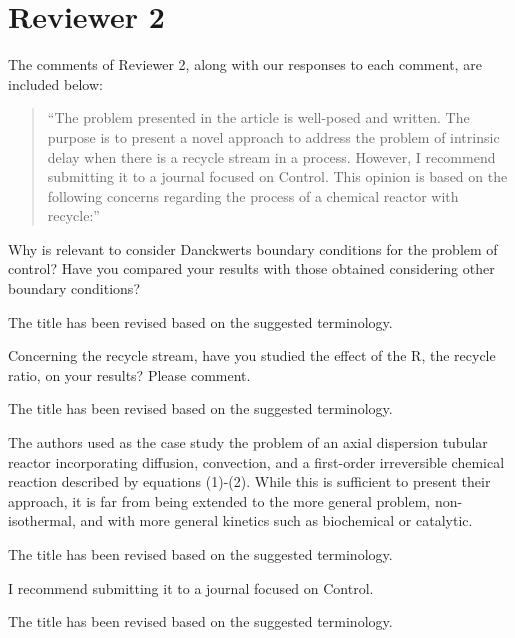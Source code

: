 \documentclass[10pt,answers]{exam}
\begin{document}
\newpage

\section*{Reviewer 2}

The comments of Reviewer 2, along with our responses to each comment, are included below:

\begin{quote}
    ``The problem presented in the article is well-posed and written. The purpose is to present a novel approach to address the problem of intrinsic delay when there is a recycle stream in a process. However, I recommend submitting it to a journal focused on Control. This opinion is based on the following concerns regarding the process of a chemical reactor with recycle:''
\end{quote}


\begin{questions}

    \question Why is relevant to consider Danckwerts boundary conditions for the problem of control? Have you compared your results with those obtained considering other boundary conditions?

    \begin{solutionorbox}
        The title has been revised based on the suggested terminology.
    \end{solutionorbox}


    \question Concerning the recycle stream, have you studied the effect of the R, the recycle ratio, on your results? Please comment.

    \begin{solutionorbox}
        The title has been revised based on the suggested terminology.
    \end{solutionorbox}

    
    \question The authors used as the case study the problem of an axial dispersion tubular reactor incorporating diffusion, convection, and a first-order irreversible chemical reaction described by equations (1)-(2). While this is sufficient to present their approach, it is far from being extended to the more general problem, non-isothermal, and with more general kinetics such as biochemical or catalytic.

    \begin{solutionorbox}
        The title has been revised based on the suggested terminology.
    \end{solutionorbox}


    \question I recommend submitting it to a journal focused on Control.

    \begin{solutionorbox}
        The title has been revised based on the suggested terminology.
    \end{solutionorbox}

\end{questions}
\end{document}
